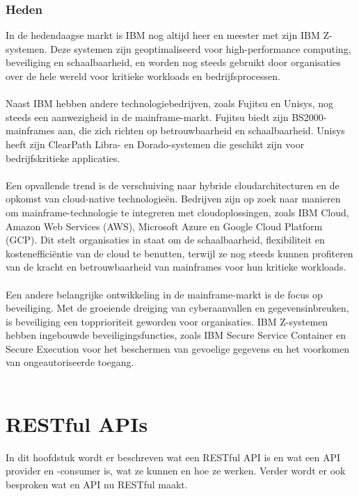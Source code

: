 \subsubsection{Heden}
\label{sec:Heden}
In de hedendaagse markt is IBM nog altijd heer en meester met zijn IBM Z-systemen. Deze systemen zijn geoptimaliseerd voor high-performance computing, beveiliging en schaalbaarheid, en worden nog steeds gebruikt door organisaties over de hele wereld voor kritieke workloads en bedrijfsprocessen.
\\ \\
Naast IBM hebben andere technologiebedrijven, zoals Fujitsu en Unisys, nog steeds een aanwezigheid in de mainframe-markt. Fujitsu biedt zijn BS2000-mainframes aan, die zich richten op betrouwbaarheid en schaalbaarheid. Unisys heeft zijn ClearPath Libra- en Dorado-systemen die geschikt zijn voor bedrijfskritieke applicaties. \autocite{Fujitsu} \autocite{Unisys}
\\ \\
Een opvallende trend is de verschuiving naar hybride cloudarchitecturen en de opkomst van cloud-native technologieën. Bedrijven zijn op zoek naar manieren om mainframe-technologie te integreren met cloudoplossingen, zoals IBM Cloud, Amazon Web Services (AWS), Microsoft Azure en Google Cloud Platform (GCP). Dit stelt organisaties in staat om de schaalbaarheid, flexibiliteit en kostenefficiëntie van de cloud te benutten, terwijl ze nog steeds kunnen profiteren van de kracht en betrouwbaarheid van mainframes voor hun kritieke workloads. \autocite{Google} \autocite{AWS}
\\ \\
Een andere belangrijke ontwikkeling in de mainframe-markt is de focus op beveiliging. Met de groeiende dreiging van cyberaanvallen en gegevensinbreuken, is beveiliging een topprioriteit geworden voor organisaties. IBM Z-systemen hebben ingebouwde beveiligingsfuncties, zoals IBM Secure Service Container en Secure Execution voor het beschermen van gevoelige gegevens en het voorkomen van ongeautoriseerde toegang. \autocite{IBMd}
\\ \\
\section{RESTful APIs}%
\label{sec:RESTful APIs}
In dit hoofdstuk wordt er beschreven wat een RESTful API is en wat een API provider en -consumer is, wat ze kunnen en hoe ze werken. Verder wordt er ook besproken wat en API nu RESTful maakt.

